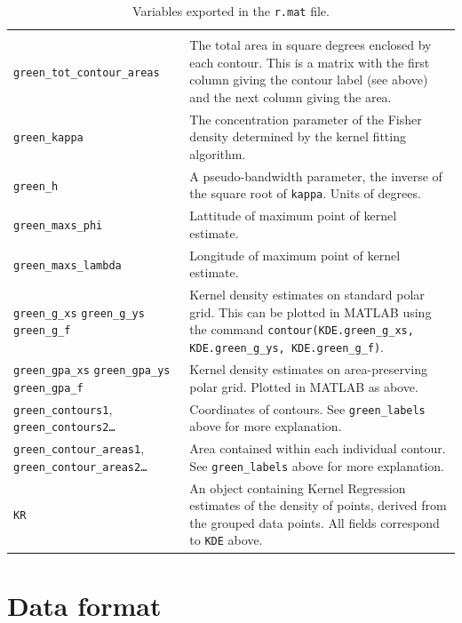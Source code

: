 \documentclass{article}
\begin{document}
\begin{table}
\begin{tabularx}{\linewidth}{p{1.2in}X}
\begin{tabular}{p{1.5in}p{3in}}
      so on. \\
      \texttt{green\_tot\_contour\_areas} & The total area in square
      degrees enclosed by each contour. This is a matrix with the
      first column giving the contour label (see above) and the
      next column giving the area. \\
      \texttt{green\_kappa} & The concentration parameter of
      the Fisher density determined by the kernel fitting algorithm. \\
      \texttt{green\_h} & A pseudo-bandwidth parameter, the inverse
      of the square root of \texttt{kappa}. Units of degrees. \\
      \texttt{green\_maxs\_phi} & Lattitude of maximum point of kernel
      estimate. \\
      \texttt{green\_maxs\_lambda} & Longitude of maximum point of kernel
      estimate. \\
      \texttt{green\_g\_xs} \texttt{green\_g\_ys} \texttt{green\_g\_f}
      & Kernel density estimates on standard polar grid. This can be
      plotted in MATLAB using the command
      \texttt{contour(KDE.green\_g\_xs, KDE.green\_g\_ys,
        KDE.green\_g\_f)}. \\
      \texttt{green\_gpa\_xs} \texttt{green\_gpa\_ys}
      \texttt{green\_gpa\_f} & Kernel density estimates on
      area-preserving polar grid. Plotted in MATLAB as above. \\
      \texttt{green\_contours1}, \texttt{green\_contours2\dots} &
      Coordinates of contours. See \texttt{green\_labels} above for
      more explanation. \\
      \texttt{green\_contour\_areas1},
      \texttt{green\_contour\_areas2\dots} & Area contained within each
      individual contour. See \texttt{green\_labels} above for more
      explanation.
    \end{tabular} \\
    \texttt{KR} & An object containing Kernel Regression estimates of the
    density of points, derived from the grouped data points. All
    fields correspond to \texttt{KDE} above.\\
    \hline
  \end{tabularx}
  \caption{Variables exported in the \texttt{r.mat} file.}
  \label{tab:matlab-export}
\end{table}

\appendix

\section{Data format}
\label{manual:sec:reading-data}
\end{document}

